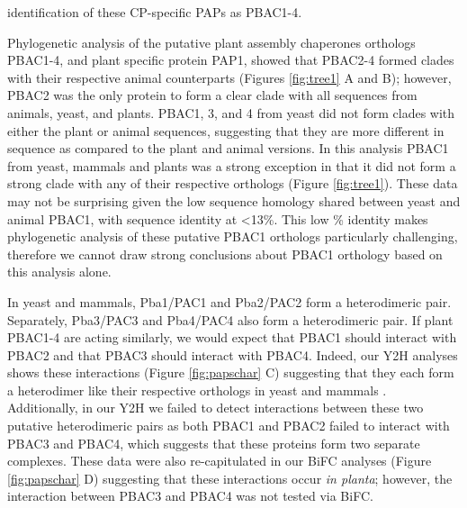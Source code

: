 identification of these CP-specific PAPs as PBAC1-4.

Phylogenetic analysis of the putative plant assembly chaperones orthologs PBAC1-4, and plant specific protein PAP1, showed that PBAC2-4 formed clades with their respective animal counterparts (Figures \ref{fig:tree1} A and B); however, PBAC2 was the only protein to form a clear clade with all sequences from animals, yeast, and plants. PBAC1, 3, and 4 from yeast did not form clades with either the plant or animal sequences, suggesting that they are more different in sequence as compared to the plant and animal versions. In this analysis PBAC1 from yeast, mammals and plants was a strong exception in that it did not form a strong clade with any of their respective orthologs (Figure \ref{fig:tree1}). These data may not be surprising given the low sequence homology shared between yeast and animal PBAC1, with sequence identity at <13\%. This low \% identity makes phylogenetic analysis of these putative PBAC1 orthologs particularly challenging, therefore we cannot draw strong conclusions about PBAC1 orthology based on this analysis alone. 

In yeast and mammals, Pba1/PAC1 and Pba2/PAC2 form a heterodimeric pair. Separately, Pba3/PAC3 and Pba4/PAC4 also form a heterodimeric pair. If plant PBAC1-4 are acting similarly, we would expect that PBAC1 should interact with PBAC2 and that PBAC3 should interact with PBAC4.  Indeed, our Y2H analyses shows these interactions (Figure \ref{fig:papschar} C) suggesting that they each form a heterodimer like their respective orthologs in yeast and mammals \citep{kunjappu14}. Additionally, in our Y2H we failed to detect interactions between these two putative heterodimeric pairs as both PBAC1 and PBAC2 failed to interact with PBAC3 and PBAC4, which suggests that these proteins form two separate complexes. These data were also re-capitulated in our BiFC analyses (Figure \ref{fig:papschar} D) suggesting that these interactions occur \textit{in planta}; however, the interaction between PBAC3 and PBAC4 was not tested via BiFC.

